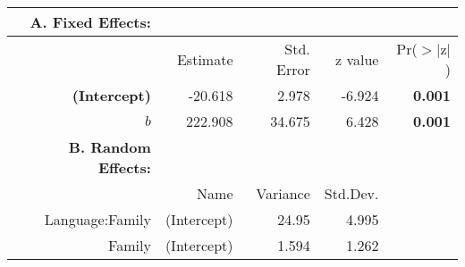 \begin{tabular}{rrrrr}
 {\bf A. Fixed Effects:} \\
\hline
 & Estimate & Std. Error & z value & Pr($>$$|$z$|$) \\ 
  \hline
{\bf (Intercept) }& -20.618 & 2.978 & -6.924 & {\bf 0.001} \\ 
 {\bf $b$ }& 222.908 & 34.675 & 6.428 & {\bf 0.001} \\ 

\hline \hline
{\bf B. Random Effects:} \\
\hline
& Name & Variance & Std.Dev. \\
\hline
Language:Family & (Intercept) & 24.95 & 4.995 \\
Family & (Intercept) & 1.594 & 1.262 \\
\end{tabular}
